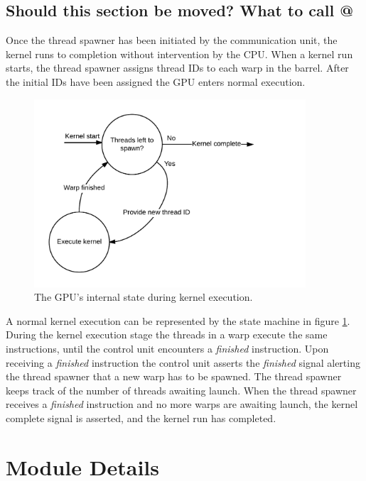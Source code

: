 \documentclass[../main/report.tex]{subfiles}
\begin{document}
\subsection{Should this section be moved? What to call @}

Once the thread spawner has been initiated by the communication unit, the kernel runs to completion without intervention by the CPU. 
When a kernel run starts, the thread spawner assigns thread IDs to each warp in the barrel.
After the initial IDs have been assigned the GPU enters normal execution.
\begin{figure}[H]
    \centering
    \includegraphics[width=0.9\textwidth]{../gpu/diagrams/kernel_run_state_machine.png}
    \caption{The GPU's internal state during kernel execution.}
    \label{fig:kernel_run_state_machine}
\end{figure}
A normal kernel execution can be represented by the state machine in figure \ref{fig:kernel_run_state_machine}.
During the kernel execution stage the threads in a warp execute the same instructions, until the control unit encounters a \emph{finished} instruction.
Upon receiving a \emph{finished} instruction the control unit asserts the \emph{finished} signal alerting the thread spawner that a new warp has to be spawned.
The thread spawner keeps track of the number of threads awaiting launch.
When the thread spawner receives a \emph{finished} instruction and no more warps are awaiting launch, the kernel complete signal is asserted, and the kernel run has completed.


\section{Module Details}
\end{document}
